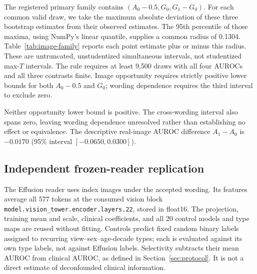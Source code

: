 The registered primary family contains $(A_0-0.5,G_0,G_1-G_0)$.
For each common valid draw, we take the maximum absolute deviation of
these three bootstrap estimates from their observed estimates. The
95th percentile of those maxima, using NumPy's linear quantile, supplies
a common radius of 0.1304. Table~\ref{tab:image-family} reports each point
estimate plus or minus this radius. These are untruncated,
unstudentized simultaneous intervals, not studentized max-$T$ intervals.
The rule requires at least 9,500 draws with all four AUROCs and all three
contrasts finite. Image opportunity requires strictly positive lower
bounds for both $A_0-0.5$ and $G_0$; wording dependence requires the third
interval to exclude zero.

\begin{table}[H]
\centering
\caption{Simultaneous image-opportunity and wording contrasts.}
\label{tab:image-family}
\end{table}

Neither opportunity lower bound is positive. The cross-wording interval
also spans zero, leaving wording dependence unresolved rather than
establishing no effect or equivalence. The descriptive real-image AUROC
difference $A_1-A_0$ is $-0.0170$ (95\% interval $[-0.0650,0.0300]$).

\clearpage
\subsection{Independent frozen-reader replication}

The Effusion reader uses index images under the accepted wording. Its
features average all 577 tokens at the consumed vision block
\texttt{model.vision\_tower.encoder.layers.22}, stored in float16.
The projection, training mean and scale, clinical coefficients, and all
20 control models and type maps are reused without fitting. Controls
predict fixed random binary labels assigned to recurring
view--sex--age-decade types; each is evaluated against its own type labels,
not against Effusion labels. Selectivity subtracts their mean AUROC from
clinical AUROC, as defined in Section~\ref{sec:protocol}. It is not a direct
estimate of deconfounded clinical information.

